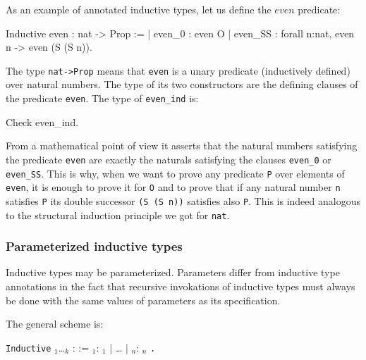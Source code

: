 As an example of annotated inductive types, let us define the
$even$ predicate:

\begin{coq_example}
Inductive even : nat -> Prop :=
  | even_0 : even O
  | even_SS : forall n:nat, even n -> even (S (S n)).
\end{coq_example}

The type {\tt nat->Prop} means that {\tt even} is a unary predicate
(inductively defined) over natural numbers.  The type of its two
constructors are the defining clauses of the predicate {\tt even}. The
type of {\tt even\_ind} is:

\begin{coq_example}
Check even_ind.
\end{coq_example}

From a mathematical point of view it asserts that the natural numbers
satisfying the predicate {\tt even} are exactly the naturals satisfying
the clauses {\tt even\_0} or {\tt even\_SS}. This is why, when we want
to prove any predicate {\tt P} over elements of {\tt even}, it is
enough to prove it for {\tt O} and to prove that if any natural number
{\tt n} satisfies {\tt P} its double successor {\tt (S (S n))}
satisfies also {\tt P}. This is indeed analogous to the structural
induction principle we got for {\tt nat}.

\begin{ErrMsgs}
\item {}
\item {}
\end{ErrMsgs}

\subsubsection{Parameterized inductive types}

Inductive types may be parameterized. Parameters differ from inductive
type annotations in the fact that recursive invokations of inductive
types must always be done with the same values of parameters as its
specification.

The general scheme is:
\begin{center}
{\tt Inductive} {\ident} {\binder$_1$}\ldots{\binder$_k$} : {\term} :=
    {\ident$_1$}: {\term$_1$} | {\ldots} | {\ident$_n$}: \term$_n$
{\tt .}
\end{center}

